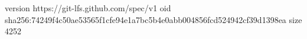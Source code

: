 version https://git-lfs.github.com/spec/v1
oid sha256:74249f4c50ae53565f1cfe94e1a7bc5b4e0abb004856fcd524942cf39d1398ea
size 4252
